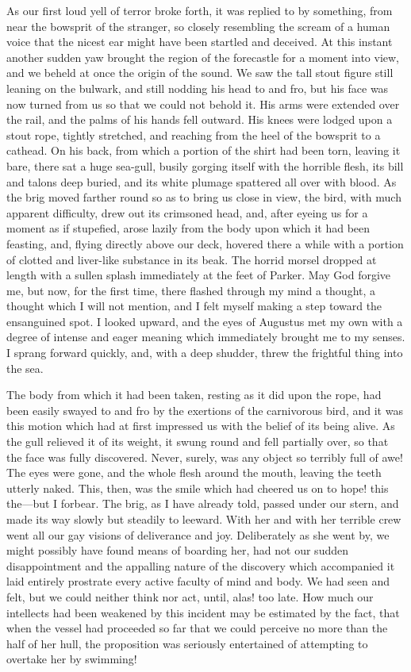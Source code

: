 As our first loud yell of terror broke forth, it was replied to by something,
from near the bowsprit of the stranger, so closely resembling the scream of a
human voice that the nicest ear might have been startled and deceived. At this
instant another sudden yaw brought the region of the forecastle for a moment
into view, and we beheld at once the origin of the sound. We saw the tall stout
figure still leaning on the bulwark, and still nodding his head to and fro, but
his face was now turned from us so that we could not behold it. His arms were
extended over the rail, and the palms of his hands fell outward. His knees were
lodged upon a stout rope, tightly stretched, and reaching from the heel of the
bowsprit to a cathead. On his back, from which a portion of the shirt had been
torn, leaving it bare, there sat a huge sea-gull, busily gorging itself with the
horrible flesh, its bill and talons deep buried, and its white plumage spattered
all over with blood. As the brig moved farther round so as to bring us close in
view, the bird, with much apparent difficulty, drew out its crimsoned head, and,
after eyeing us for a moment as if stupefied, arose lazily from the body upon
which it had been feasting, and, flying directly above our deck, hovered there a
while with a portion of clotted and liver-like substance in its beak. The horrid
morsel dropped at length with a sullen splash immediately at the feet of Parker.
May God forgive me, but now, for the first time, there flashed through my mind a
thought, a thought which I will not mention, and I felt myself making a step
toward the ensanguined spot. I looked upward, and the eyes of Augustus met my
own with a degree of intense and eager meaning which immediately brought me to
my senses. I sprang forward quickly, and, with a deep shudder, threw the
frightful thing into the sea. 

The body from which it had been taken, resting as it did upon the rope, had
been easily swayed to and fro by the exertions of the carnivorous bird, and it
was this motion which had at first impressed us with the belief of its being
alive. As the gull relieved it of its weight, it swung round and fell partially
over, so that the face was fully discovered. Never, surely, was any object so
terribly full of awe! The eyes were gone, and the whole flesh around the mouth,
leaving the teeth utterly naked. This, then, was the smile which had cheered us
on to hope! this the---but I forbear. The brig, as I have already told, passed
under our stern, and made its way slowly but steadily to leeward. With her and
with her terrible crew went all our gay visions of deliverance and joy.
Deliberately as she went by, we might possibly have found means of boarding her,
had not our sudden disappointment and the appalling nature of the discovery
which accompanied it laid entirely prostrate every active faculty of mind and
body. We had seen and felt, but we could neither think nor act, until, alas! too
late. How much our intellects had been weakened by this incident may be
estimated by the fact, that when the vessel had proceeded so far that we could
perceive no more than the half of her hull, the proposition was seriously
entertained of attempting to overtake her by swimming! 

